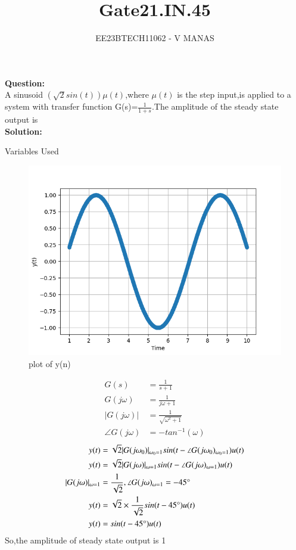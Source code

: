 \documentclass[journal,12pt,twocolumn]{IEEEtran}
\theoremstyle{remark}
\begin{document}

\vspace{3cm}

\title{Gate21.IN.45}
\author{EE23BTECH11062 - V MANAS}
\maketitle
\newpage

\bigskip
\textbf{Question:}\\A sinusoid $(\sqrt{2}sin(t))\mu(t)$,where $\mu(t)$ is the step input,is applied to a system with transfer function G(s)=$\frac{1}{1+s}$.The amplitude of the steady state output is\\
\textbf{Solution:}
\begin{table}[h]
    \centering
    
    \caption{Variables Used}
    \label{tab:gate21.in.45}
\end{table}
\begin{figure}[h]
    \centering
    \includegraphics[width=1.0\linewidth]{figs/graph.png}
    \caption{plot of y(n)}
\end{figure}
\begin{align}
    G(s)&=\frac{1}{s+1}\\
    G(j\omega)&=\frac{1}{j\omega+1}\\
    |G(j\omega)|&=\frac{1}{\sqrt{\omega^2+1}}\\
    \angle G(j\omega)&=-tan^{-1}(\omega)
\end{align}
\begin{align}
    y(t)&=\sqrt{2}|G(j\omega_0)|_{\omega_0=1}sin(t-\angle G(j\omega_0)_{\omega_0=1})u(t)\\    
    y(t)&=\sqrt{2}|G(j\omega)|_{\omega=1}sin(t-\angle G(j\omega)_{\omega=1})u(t)\\
    |G(j\omega)|_{\omega=1}&=\frac{1}{\sqrt{2}},\angle G(j\omega)_{\omega=1}=-45\degree\\
    y(t)&=\sqrt{2}\times\frac{1}{\sqrt{2}}sin(t-45\degree)u(t)\\
    y(t)&=sin(t-45\degree)u(t)
\end{align}
So,the amplitude of steady state output is 1
\end{document}
